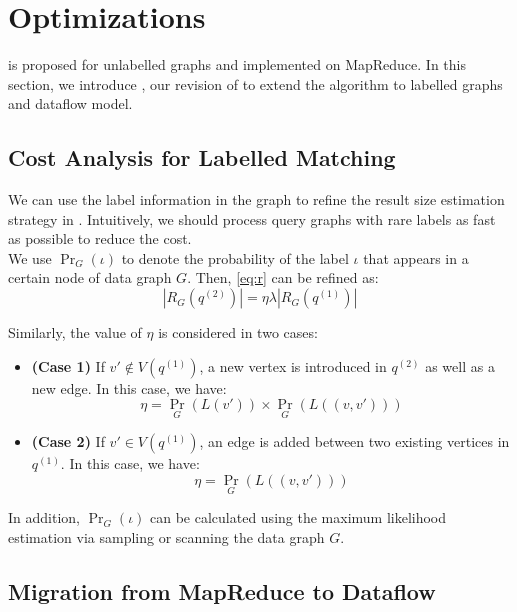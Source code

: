 \section{Optimizations}
\label{sec:opt}

\cliquejoin is proposed for unlabelled graphs and implemented on MapReduce. In this section, we introduce \gencliqjoin, our revision of \cliquejoin to extend the algorithm to labelled graphs and dataflow model.

\subsection{Cost Analysis for Labelled Matching}

We can use the label information in the graph to refine the result size estimation strategy in \gencliqjoin. Intuitively, we should process query graphs with rare labels as fast as possible to reduce the cost. \\

We use $\Pr_{G}(\iota)$ to denote the probability of the label $\iota$ that appears in a certain node of data graph $G$. Then, \eqref{eq:r} can be refined as:
\begin{equation} \label{eq:rr}
|R_{G}(q^{(2)})|=\eta\lambda |R_{G}(q^{(1)})|
\end{equation}

Similarly, the value of $\eta$ is considered in two cases:

\begin{itemize}
\item \textbf{(Case 1)} If $v'\not\in V(q^{(1)})$, a new vertex is introduced in $q^{(2)}$ as well as a new edge. In this case, we have:
\begin{equation} \label{eq6-new}
 \textstyle \eta = \Pr_{G}(L(v')) \times \Pr_{G}(L((v,v')))
\end{equation}

\item \textbf{(Case 2)} If $v'\in V(q^{(1)})$, an edge is added between two existing vertices in $q^{(1)}$. In this case, we have:
\begin{equation} \label{eq:7-new}
\textstyle \eta = \Pr_{G}(L((v,v')))
\end{equation}
\end{itemize}

In addition, $\Pr_{G} (\iota)$ can be calculated using the maximum likelihood estimation via sampling or scanning the data graph $G$.

\subsection{Migration from MapReduce to Dataflow} \label{to-df}

